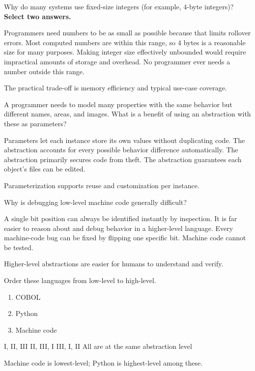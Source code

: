 \question[5]
Why do many systems use fixed-size integers (for example, 4-byte integers)? \textbf{Select two answers.}
\begin{checkboxes}
  \choice Programmers need numbers to be as small as possible because that limits rollover errors.
  \CorrectChoice Most computed numbers are within this range, so 4 bytes is a reasonable size for many purposes.
  \CorrectChoice Making integer size effectively unbounded would require impractical amounts of storage and overhead.
  \choice No programmer ever needs a number outside this range.
\end{checkboxes}
\begin{solution}
  The practical trade-off is memory efficiency and typical use-case coverage.
\end{solution}

\newpage 

\question[5]
A programmer needs to model many properties with the same behavior but different names, areas, and images. What is a benefit of using an abstraction with these as parameters?
\begin{choices}
  \CorrectChoice Parameters let each instance store its own values without duplicating code.
  \choice The abstraction accounts for every possible behavior difference automatically.
  \choice The abstraction primarily secures code from theft.
  \choice The abstraction guarantees each object's files can be edited.
\end{choices}
\begin{solution}
  Parameterization supports reuse and customization per instance.
\end{solution}

\question[5]
Why is debugging low-level machine code generally difficult?
\begin{choices}
  \choice A single bit position can always be identified instantly by inspection.
  \CorrectChoice It is far easier to reason about and debug behavior in a higher-level language.
  \choice Every machine-code bug can be fixed by flipping one specific bit.
  \choice Machine code cannot be tested.
\end{choices}
\begin{solution}
  Higher-level abstractions are easier for humans to understand and verify.
\end{solution}

\question[5]
Order these languages from low-level to high-level.
\begin{enumerate}
  \renewcommand{\labelenumi}{\Roman{enumi}.}
  \item COBOL
  \item Python
  \item Machine code
\end{enumerate}
\begin{choices}
  \choice I, II, III
  \choice II, III, I
  \CorrectChoice III, I, II
  \choice All are at the same abstraction level
\end{choices}
\begin{solution}
  Machine code is lowest-level; Python is highest-level among these.
\end{solution}

